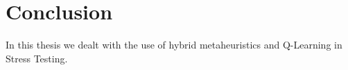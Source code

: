 \chapter{Conclusion}

In this thesis we dealt with the use of hybrid metaheuristics and Q-Learning in Stress Testing.